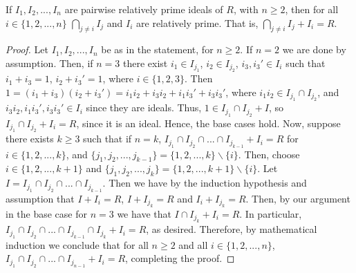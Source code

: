 \documentclass[12pt, a4paper, oneside, openright, titlepage]{book}
\begin{document}
\begin{lem}
    If $I_1, I_2,..., I_n$ are pairwise relatively prime ideals of $R$, with $n \geq 2$, then for all $i \in \{1,2,...,n\}$ $\bigcap_{j\neq i} I_j$ and $I_i$ are relatively prime. That is, $\bigcap_{j\neq i} I_j + I_i = R$.
    \begin{proof}
        Let $I_1, I_2,..., I_n$ be as in the statement, for $n \geq 2$. If $n = 2$ we are done by assumption. Then, if $n = 3$ there exist $i_1 \in I_{j_1}$, $i_2 \in I_{j_2}$, $i_3,i_3' \in I_i$ such that $i_1+i_3 = 1$, $i_2+i_3' = 1$, where $i \in \{1,2,3\}$. Then $1 = (i_1+i_3)(i_2+i_3') = i_1i_2 + i_3i_2 + i_1i_3' + i_3i_3'$, where $i_1i_2 \in I_{j_1} \cap I_{j_2}$, and $i_3i_2,i_1i_3',i_3i_3' \in I_i$ since they are ideals. Thus, $1 \in I_{j_1}\cap I_{j_2} + I$, so $I_{j_1} \cap I_{j_2} + I_i = R$, since it is an ideal. Hence, the base cases hold. Now, suppose there exists $k \geq 3$ such that if $n = k$, $I_{j_1}\cap I_{j_2} \cap ... \cap I_{j_{k-1}} + I_i = R$ for $i \in \{1,2,...,k\}$, and $\{j_1,j_2,...,j_{k-1}\} = \{1,2,...,k\}\backslash\{i\}$. Then, choose $i \in \{1,2,...,k+1\}$ and $\{j_1,j_2,...,j_{k}\} = \{1,2,...,k+1\}\backslash\{i\}$. Let $I = I_{j_1}\cap I_{j_2} \cap ... \cap I_{j_{k-1}}$. Then we have by the induction hypothesis and assumption that $I + I_i = R$, $I + I_{j_k} = R$ and $I_i + I_{j_k} = R$. Then, by our argument in the base case for $n = 3$ we have that $I \cap I_{j_k} + I_i = R$. In particular, $I_{j_1}\cap I_{j_2} \cap ... \cap I_{j_{k-1}} \cap I_{j_k} + I_i = R$, as desired. Therefore, by mathematical induction we conclude that for all $n \geq 2$ and all $i \in \{1,2,...,n\}$, $I_{j_1}\cap I_{j_2} \cap ... \cap I_{j_{n-1}} + I_i = R$, completing the proof.
    \end{proof}
    \label{genCRTLem}
\end{lem}
\end{document}
